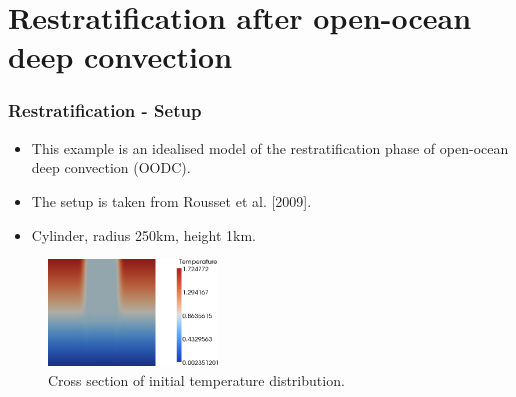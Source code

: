 \section{Restratification after open-ocean deep convection}

\begin{frame}
    \frametitle{Restratification - Setup}
\begin{itemize}
    \item This example is an idealised model of the restratification phase of open-ocean deep convection (OODC).
    \item The setup is taken from Rousset et al. [2009].
    \item Cylinder, radius 250km, height 1km.
\end{itemize}
\begin{figure}
\centering
\includegraphics[width=0.4\textwidth]{./restratification_after_oodc/rousset-init.png}
\caption{Cross section of initial temperature distribution.}
\end{figure}
\end{frame}

